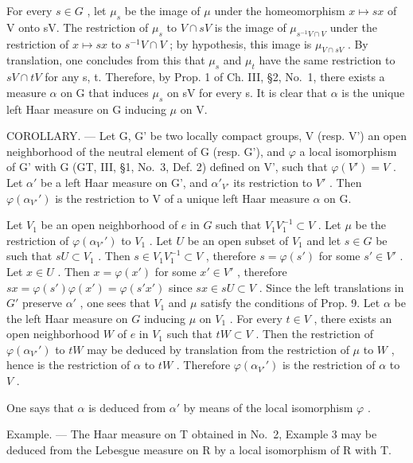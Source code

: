 For every \(s \in G\) , let \(\mu_{s}\) be the image of \(\mu\) under the homeomorphism \(x \mapsto sx\) of V onto sV. The restriction of \(\mu_{s}\) to \(V \cap sV\) is the image of \(\mu_{s^{-1}V \cap V}\) under the restriction of \(x \mapsto sx\) to \(s^{-1}V \cap V\) ; by hypothesis, this image is \(\mu_{V \cap sV}\) . By translation, one concludes from this that \(\mu_{s}\) and \(\mu_{t}\) have the same restriction to \(sV \cap tV\) for any s, t. Therefore, by Prop. 1 of Ch. III, §2, No.~1, there exists a measure \(\alpha\) on G that induces \(\mu_{s}\) on sV for every s. It is clear that \(\alpha\) is the unique left Haar measure on G inducing \(\mu\) on V.

COROLLARY. --- Let G, G' be two locally compact groups, V (resp. V') an open neighborhood of the neutral element of G (resp. G'), and \(\varphi\) a local isomorphism of G' with G (GT, III, §1, No.~3, Def. 2) defined on V', such that \(\varphi(V') = V\) . Let \(\alpha'\) be a left Haar measure on G', and \(\alpha'_{V'}\) its restriction to \(V'\) . Then \(\varphi(\alpha_{V'}')\) is the restriction to V of a unique left Haar measure \(\alpha\) on G.

Let \(V_1\) be an open neighborhood of \(e\) in \(G\) such that \(V_1V_1^{-1} \subset V\) . Let \(\mu\) be the restriction of \(\varphi(\alpha_{V'}')\) to \(V_1\) . Let \(U\) be an open subset of \(V_1\) and let \(s \in G\) be such that \(sU \subset V_1\) . Then \(s \in V_1V_1^{-1} \subset V\) , therefore \(s = \varphi(s')\) for some \(s' \in V'\) . Let \(x \in U\) . Then \(x = \varphi(x')\) for some \(x' \in V'\) , therefore \(sx = \varphi(s')\varphi(x') = \varphi(s'x')\) since \(sx \in sU \subset V\) . Since the left translations in \(G'\) preserve \(\alpha'\) , one sees that \(V_1\) and \(\mu\) satisfy the conditions of Prop. 9. Let \(\alpha\) be the left Haar measure on \(G\) inducing \(\mu\) on \(V_1\) . For every \(t \in V\) , there exists an open neighborhood \(W\) of \(e\) in \(V_1\) such that \(tW \subset V\) . Then the restriction of \(\varphi(\alpha_{V'}')\) to \(tW\) may be deduced by translation from the restriction of \(\mu\) to \(W\) , hence is the restriction of \(\alpha\) to \(tW\) . Therefore \(\varphi(\alpha_{V'}')\) is the restriction of \(\alpha\) to \(V\) .

One says that \(\alpha\) is deduced from \(\alpha'\) by means of the local isomorphism \(\varphi\) .

Example. --- The Haar measure on T obtained in No.~2, Example 3 may be deduced from the Lebesgue measure on R by a local isomorphism of R with T.

